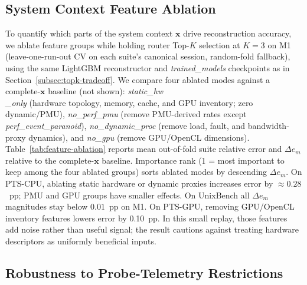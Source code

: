 \documentclass[sigconf, review, anonymous, balance=false]{acmart}
\newcommand{\ptscpu}{PTS-CPU}
\newcommand{\ptsgpu}{PTS-GPU}
\newcommand{\id}[1]{{\itshape #1}}
\begin{document}
\subsection{System Context Feature Ablation}
\label{subsec:feature-ablation}
To quantify which parts of the system context \(\mathbf{x}\) drive reconstruction accuracy, we ablate feature groups while holding router Top-$K$ selection at $K{=}3$ on M1 (leave-one-run-out CV on each suite's canonical session, random-fold fallback), using the same LightGBM reconstructor and \id{trained\_models} checkpoints as in Section~\ref{subsec:topk-tradeoff}.
We compare four ablated modes against a complete-\(\mathbf{x}\) baseline (not shown):
\id{static\_hw\\\_only} (hardware topology, memory, cache, and GPU inventory; zero dynamic/PMU),
\id{no\_perf\_pmu} (remove PMU-derived rates except \id{perf\_event\_paranoid}),
\id{no\_dynamic\_proc} (remove load, fault, and bandwidth-proxy dynamics),
and \id{no\_gpu} (remove GPU/OpenCL dimensions).
Table~\ref{tab:feature-ablation} reports mean out-of-fold suite relative error and $\Delta e_m$ relative to the complete-\(\mathbf{x}\) baseline.
Importance rank (1 = most important to keep among the four ablated groups) sorts ablated modes by descending $\Delta e_m$.
On \ptscpu, ablating static hardware or dynamic  proxies increases error by ${\approx}0.28$~pp; PMU and GPU groups have smaller effects.
On UnixBench all $\Delta e_m$ magnitudes stay below $0.01$~pp on M1.
On \ptsgpu, removing GPU/OpenCL inventory features lowers error by 0.10~pp. In this small replay, those features add noise rather than useful signal; the result cautions against treating hardware descriptors as uniformly beneficial inputs.


\subsection{Robustness to Probe-Telemetry Restrictions}
\label{subsec:probe-ebpf-ablation}
\end{document}
